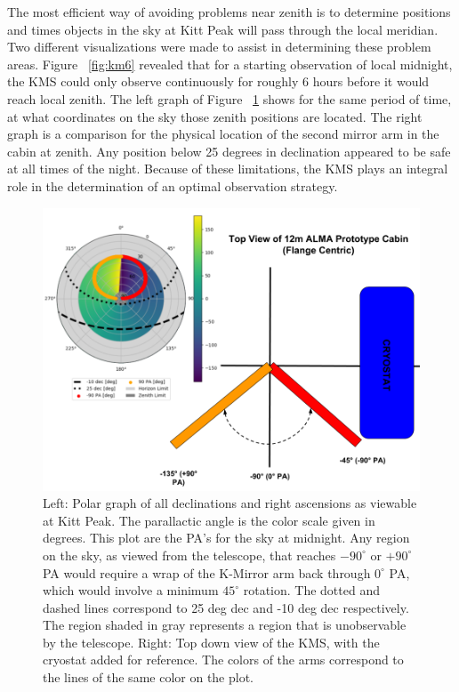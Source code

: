 \documentclass[manuscript]{aastex}
\begin{document}
The most efficient way of avoiding problems near zenith is to determine positions and times objects in the sky at Kitt Peak will pass through the local meridian. Two different visualizations were made to assist in determining these problem areas. Figure ~\ref{fig:km6} revealed that for a starting observation of local midnight, the KMS could only observe continuously for roughly 6 hours before it would reach local zenith. The left graph of Figure ~\ref{fig:km45} shows for the same period of time, at what coordinates on the sky those zenith positions are located. The right graph is a comparison for the physical location of the second mirror arm in the cabin at zenith. Any position below 25 degrees in declination appeared to be safe at all times of the night. Because of these limitations, the KMS plays an integral role in the determination of an optimal observation strategy.   

\begin{figure}[ht!]
	\centering
	\includegraphics[width=\textwidth]{km45.png}%
	\caption[Parallactic Angle Graphs to Determine Zenith Positions]{Left: Polar graph of all declinations and right ascensions as viewable at Kitt Peak. The parallactic angle is the color scale given in degrees. This plot are the PA's for the sky at midnight. Any region on the sky, as viewed from the telescope, that reaches $-90^{\circ}$ or $+90^{\circ}$ PA would require a wrap of the K-Mirror arm back through $0^{\circ}$ PA, which would involve a minimum $45^{\circ}$ rotation. The dotted and dashed lines correspond to 25 deg dec and -10 deg dec respectively. The region shaded in gray represents a region that is unobservable by the telescope. Right: Top down view of the KMS, with the cryostat added for reference. The colors of the arms correspond to the lines of the same color on the plot.}%
	\label{fig:km45}%
\end{figure}
\end{document}
